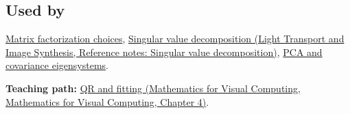 \subsection{Used by}\label{appendix-c3421e6b4f2c-used-by}

\hyperref[appendix-221a483bec2d]{Matrix factorization choices}, \href{../04-Light-Transport-and-Image-Synthesis/main.pdf\#nameddest=appendix-1fad5e7f36fa}{Singular value decomposition (Light Transport and Image Synthesis, Reference notes: Singular value decomposition)}, \hyperref[appendix-ad175ef3c5bf]{PCA and covariance eigensystems}.

\textbf{Teaching path:} \href{../02-Mathematics-for-Visual-Computing/main.pdf\#nameddest=01-foundations-i-ch020-structure-makes-a-decomposition-a-better-tool-than-generic-elimination}{QR and fitting (Mathematics for Visual Computing, Mathematics for Visual Computing, Chapter 4)}.
